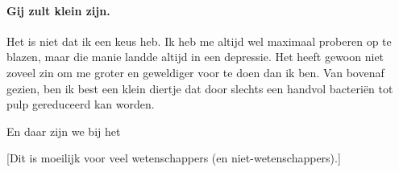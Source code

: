 \documentclass[12pt,a4paper]{article}
\begin{document}
\paragraph{Gij zult klein zijn.} Het is niet dat ik een keus heb. Ik heb me altijd wel maximaal proberen op te blazen, maar die manie landde altijd in een depressie. Het heeft gewoon niet zoveel zin om me groter en geweldiger voor te doen dan ik ben. Van bovenaf gezien, ben ik best een klein diertje dat door slechts een handvol bacteriën tot pulp gereduceerd kan worden.

En daar zijn we bij het 

[Dit is moeilijk voor veel wetenschappers (en niet-wetenschappers).]
\end{document}
